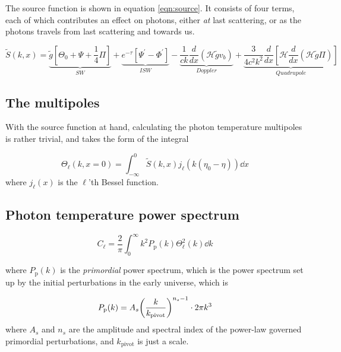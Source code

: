 \documentclass[10pt, a4paper]{article}
\begin{document}
The source function is shown in equation \ref{eqn:source}. It consists of four terms, each of which contributes an effect on photons, either \textit{at} last scattering, or as the photons travels from last scattering and towards us.

\begin{equation}
    \label{eqn:source}
    \tilde{S}(k, x) = 
    \underbrace{\tilde{g}\left[\Theta_{0}+\Psi+\frac{1}{4} \Pi\right]}_{SW}
    + \underbrace{e^{-\tau}\left[\Psi^{\prime}-\Phi^{\prime}\right]}_{ISW}
    - \underbrace{\frac{1}{c k} \frac{d}{d x}\left(\mathcal{H} \tilde{g} v_{b}\right)}_{Doppler}
    + \underbrace{\frac{3}{4 c^{2} k^{2}} \frac{d}{d x}\left[\mathcal{H} \frac{d}{d x}(\mathcal{H} \tilde{g} \Pi)\right]}_{Quadrupole}
\end{equation}



\subsection{The multipoles}
With the source function at hand, calculating the photon temperature multipoles is rather trivial, and takes the form of the integral

\begin{equation}
    \Theta_{\ell}(k, x=0)=\int_{-\infty}^{0} \tilde{S}(k, x) j_{\ell}\left(k\left(\eta_{0}-\eta\right)\right) \dd{x}
\end{equation}
where $j_\ell(x)$ is the $\ell$'th Bessel function.


\subsection{Photon temperature power spectrum}

\begin{equation}
    C_{\ell}=\frac{2}{\pi} \int_0^\infty k^{2} P_{\text {p}}(k) \Theta_{\ell}^{2}(k) \dd{k}
\end{equation}

where $P_\text{p}(k)$ is the \textit{primordial} power spectrum, which is the power spectrum set up by the initial perturbations in the early universe, which is

\begin{equation}
    P_\text{p}(k) = A_s \qty(\frac{k}{k_\text{pivot}})^{n_s-1} \cdot 2\pi k^3
\end{equation}
where $A_s$ and $n_s$ are the amplitude and spectral index of the power-law governed primordial perturbations, and $k_\text{pivot}$ is just a scale.
\end{document}
